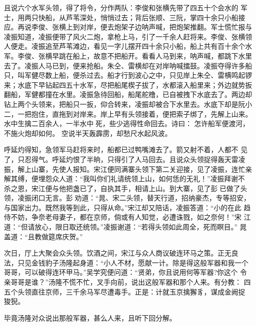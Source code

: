且说六个水军头领，得了将令，分作两队：李俊和张横先带了四五十个会水的
军士，用两只快船，从芦苇深处，悄悄过去；背后张顺、三阮，掌四十余只小船接
应。再说李俊、张横上到对岸，便去炮架子边呐声喊，把炮架推翻。军士慌忙报与
凌振知道，凌振便带了风火二炮，拿枪上马，引了一千余人赶将来。李俊、张横领
人便走。凌振追至芦苇滩边，看见一字儿摆开四十余只小船，船上共有百十余个水
军。李俊、张横早跳在船上，故意不把船开。看看人马到来，呐声喊，都跳下水里
去了。凌振人马已到，便来抢船。朱仝、雷横却在对岸呐喊擂鼓。凌振夺得许多船
只，叫军健尽数上船，便杀过去。船才行到波心之中，只见岸上朱仝、雷横鸣起锣
来；水底下早钻起四五十水军，尽把船尾楔子拔了，水都滚入船里来；外边就势扳
翻船，军健都撞在水里。凌振急待回船，船尾舵橹，已自被拽下水底去了。两边却
钻上两个头领来，把船只一扳，仰合转来，凌振却被合下水里去。水底下却是阮小
二，一把抱住，直拖到对岸来。岸上早有头领接着，便把索子绑了，先解上山来。
水中生擒二百余人，一半水中死，些少逃得性命回去。诗曰：
怎许船军便渡河，不施火炮却如何。
空说半天轰霹雳，却愁尺水起风波。

呼延灼得知，急领军马赶将来时，船都已过鸭嘴滩去了。箭又射不着，人都不
见了，只忍得气。呼延灼恨了半晌，只得引了人马回去。且说众头领捉得轰天雷凌
振，解上山寨，先使人报知。宋江便同满寨头领下第二关迎接，见了凌振，连忙亲
解其缚，便埋怨众人道：“我叫你们礼请统领上山，如何恁的无礼！”凌振拜谢不
杀之恩，宋江便与他把盏已了，自执其手，相请上山。到大寨，见了彭已做了头
领，凌振闭口无言。彭劝道：“晁、宋二头领，替天行道，招纳豪杰，专等招安，
与国家出力。既然我等到此，只得从命。”宋江却又陪话，凌振答道：“小的在此
趋侍不妨，争奈老母妻子，都在京师，倘或有人知觉，必遭诛戮，如之奈何！”宋
江道：“但请放心，限日取还统领。”凌振谢道：“若得头领如此周全，死而瞑目。”
晁盖道：“且教做筵席庆贺。”

次日，厅上大聚会众头领。饮酒之间，宋江与众人商议破连环马之策。正无良
法，只见金钱豹子汤隆起身道：“小人不材，愿献一计。除是得这般军器和我一个
哥哥，可以破得连环甲马。”吴学究便问道：“贤弟，你且说用何等军器?你这个
令亲哥哥是谁？”汤隆不慌不忙，叉手向前，说出这般军器和那个人来。有分教：
四五个头领直往京师，三千余马军尽遭毒手。正是：计就玉京擒獬豸，谋成金阙捉
狻猊。

毕竟汤隆对众说出那般军器，甚么人来，且听下回分解。